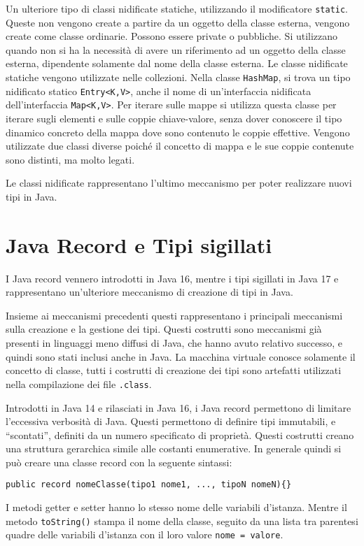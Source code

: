 \documentclass{article}
\numberwithin{equation}{subsection}
\begin{document}
Un ulteriore tipo di classi nidificate statiche, utilizzando il modificatore \verb|static|. Queste non vengono create a partire da un oggetto della classe esterna, vengono 
create come classe ordinarie. Possono essere private o pubbliche. 
Si utilizzano quando non si ha la necessità di avere un riferimento ad un oggetto della classe esterna, dipendente solamente dal nome della classe esterna. 
Le classe nidificate statiche vengono utilizzate nelle collezioni. Nella classe \verb|HashMap|, si 
trova un tipo nidificato statico \verb|Entry<K,V>|, anche il nome di un'interfaccia nidificata dell'interfaccia \verb|Map<K,V>|. Per iterare sulle mappe si utilizza questa 
classe per iterare sugli elementi e sulle coppie chiave-valore, senza dover conoscere il tipo dinamico concreto della mappa dove sono contenuto le coppie 
effettive. 
Vengono utilizzate due classi diverse poiché il concetto di mappa e le sue coppie contenute sono distinti, ma molto legati. 

Le classi nidificate rappresentano l'ultimo meccanismo per poter realizzare nuovi tipi in Java. 

\clearpage

\section{Java Record e Tipi sigillati}

I Java record vennero introdotti in Java 16, mentre i tipi sigillati in Java 17 e rappresentano un'ulteriore meccanismo di creazione di tipi in Java. 

Insieme ai meccanismi precedenti questi rappresentano i principali meccanismi sulla creazione e la gestione dei tipi. Questi costrutti sono meccanismi già presenti in 
linguaggi meno diffusi di Java, che hanno avuto relativo successo, e quindi sono stati inclusi anche in Java. 
La macchina virtuale conosce solamente il concetto di classe, tutti i costrutti di creazione dei tipi sono artefatti utilizzati nella compilazione dei file \verb|.class|. 

Introdotti in Java 14 e rilasciati in Java 16, i Java record permettono di limitare l'eccessiva verbosità di Java. Questi permettono di definire tipi immutabili, e 
``scontati'', definiti da un numero specificato di proprietà. 
Questi costrutti creano una struttura gerarchica simile alle costanti enumerative. In generale quindi si può creare una classe record con la seguente sintassi:
\begin{verbatim}
public record nomeClasse(tipo1 nome1, ..., tipoN nomeN){}
\end{verbatim}
I metodi getter e setter hanno lo stesso nome delle variabili d'istanza. Mentre il metodo \verb|toString()| stampa il nome della classe, seguito da una lista tra parentesi 
quadre delle variabili d'istanza con il loro valore \verb|nome = valore|. 
\end{document}
